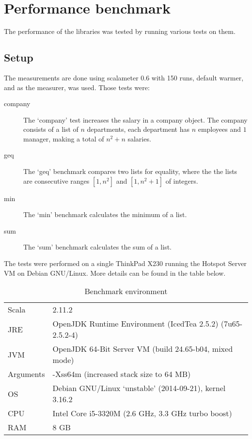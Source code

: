 \section{Performance benchmark}
The performance of the libraries was tested by running various tests on them.
\subsection{Setup}
The measurements are done using scalameter 0.6 with 150 runs, default warmer,
and as the measurer, 
was used. Those tests were:
\begin{description}
    \item[company]The `company' test increases the salary in a company
object. The company consists of a list of $n$ departments, each department has
$n$ employees and $1$ manager, making a total of $n^{2} + n$ salaries.

    \item[geq] The `geq' benchmark compares two lists for equality, where the
               the lists are consecutive ranges $[1, n^{2}]$ and $[1, n^{2} +1]$ of
               integers.

    \item[min] The `min' benchmark calculates the minimum of a list.

    \item[sum] The `sum' benchmark calculates the sum of a list.
\end{description}

The tests were performed on a single ThinkPad X230 running the Hotspot Server
VM on Debian GNU/Linux. More details can be found in the table below.

\begin{table}[b]
    \centering
\begin{tabular}{l|l}
    Scala & 2.11.2 \\
    JRE   & OpenJDK Runtime Environment (IcedTea 2.5.2) (7u65-2.5.2-4) \\
    JVM   & OpenJDK 64-Bit Server VM (build 24.65-b04, mixed mode) \\
    Arguments & -Xss64m (increased stack size to 64 MB) \\
    OS    & Debian GNU/Linux `unstable' (2014-09-21), kernel 3.16.2 \\\hline
    CPU   & Intel Core i5-3320M (2.6 GHz, 3.3 GHz turbo boost) \\
    RAM   & 8 GB
\end{tabular}
\caption{Benchmark environment}
\end{table}

